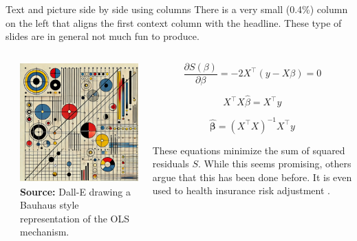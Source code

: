 \documentclass[11pt, aspectratio=169, t]{beamer}
\begin{document}
\begin{frame}{Text and picture side by side using columns}
\label{text-and-picture-side-by-side-using-columns}
There is a very small (0.4\%) column on the left that aligns the first
context column with the headline. These type of slides are in general
not much fun to produce.

\begin{columns}[T]
\begin{column}{0.004\linewidth}
\end{column}

\begin{column}{0.446\linewidth}
\includegraphics[width=\linewidth,height=1.80556in,keepaspectratio]{pictures/OLSpic.png}
\newline \scriptsize\textbf{Source:} Dall-E drawing a Bauhaus style
representation of the OLS mechanism.
\end{column}

\begin{column}{0.55\linewidth}
\normalsize

\begin{equation}
\frac{\partial S(\beta)}{\partial \beta} = -2X^\top (y - X\beta) = 0
\end{equation}

\begin{equation}
X^\top X \hat{\beta} = X^\top y
\end{equation}

\begin{equation}
\hat{\bm{\beta}} = (X^\top X)^{-1} X^\top y
\end{equation}

These equations minimize the sum of squared residuals \(S\). While this
seems promising, others argue that this has been done before. It is even
used to health insurance risk adjustment
\autocite[EJHE]{reifSettingIncentivesRight2025}.
\end{column}
\end{columns}
\end{frame}
\end{document}
